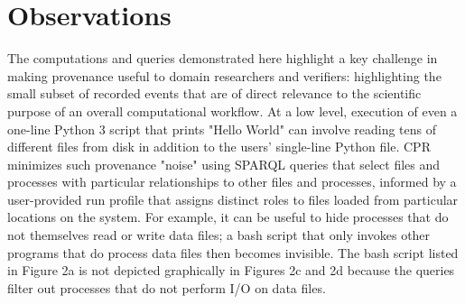 \section{Observations}

The computations and queries demonstrated here highlight a key challenge in making provenance useful to domain researchers and verifiers: highlighting the small subset of recorded events that are of direct relevance to the scientific purpose of an overall computational workflow. At a low level, execution of even a one-line Python 3 script that prints "Hello World" can involve reading tens of different files from disk in addition to the users' single-line Python file. CPR minimizes such provenance "noise" using SPARQL queries that select files and processes with particular relationships to other files and processes, informed by a user-provided run profile that assigns distinct roles to files loaded from particular locations on the system.  For example, it can be useful to hide processes that do not themselves read or write data files; a bash script that only invokes other programs that do process data files then becomes invisible. The bash script listed in Figure 2a is not depicted graphically in Figures 2c and 2d because the queries filter out processes that do not perform I/O on data files.



